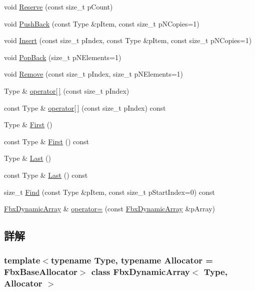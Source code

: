 \begin{DoxyCompactItemize}
void \hyperlink{class_fbx_dynamic_array_a056d5da710401c88f5c92fb5d77c725d}{Reserve} (const size\+\_\+t p\+Count)
\item 
void \hyperlink{class_fbx_dynamic_array_a50d7516815f9a6ad04a26beb66341dd6}{Push\+Back} (const Type \&p\+Item, const size\+\_\+t p\+N\+Copies=1)
\item 
void \hyperlink{class_fbx_dynamic_array_aee7c781eb7382754473b618e766a601f}{Insert} (const size\+\_\+t p\+Index, const Type \&p\+Item, const size\+\_\+t p\+N\+Copies=1)
\item 
void \hyperlink{class_fbx_dynamic_array_a0b59c646b7ffdbffe1af2e3947426f28}{Pop\+Back} (size\+\_\+t p\+N\+Elements=1)
\item 
void \hyperlink{class_fbx_dynamic_array_abee89faf5555c293ff4332763b9234ba}{Remove} (const size\+\_\+t p\+Index, size\+\_\+t p\+N\+Elements=1)
\item 
Type \& \hyperlink{class_fbx_dynamic_array_a94ce9d01d2bd94e209b0b5bb02d8cd49}{operator\mbox{[}$\,$\mbox{]}} (const size\+\_\+t p\+Index)
\item 
const Type \& \hyperlink{class_fbx_dynamic_array_ada7506435417b4811a85f85706e9ecb9}{operator\mbox{[}$\,$\mbox{]}} (const size\+\_\+t p\+Index) const
\item 
Type \& \hyperlink{class_fbx_dynamic_array_a7eb1f73c2cc10719d104e647dfc0bd39}{First} ()
\item 
const Type \& \hyperlink{class_fbx_dynamic_array_ac7cc372d97cb5004e393cbadbd613249}{First} () const
\item 
Type \& \hyperlink{class_fbx_dynamic_array_a7419abc6a62713e4b7edaec879955425}{Last} ()
\item 
const Type \& \hyperlink{class_fbx_dynamic_array_a58a5256671ee30b3afcda3515543271f}{Last} () const
\item 
size\+\_\+t \hyperlink{class_fbx_dynamic_array_a9fc0e6555886f0e38cd7f5027ed2b6a0}{Find} (const Type \&p\+Item, const size\+\_\+t p\+Start\+Index=0) const
\item 
\hyperlink{class_fbx_dynamic_array}{Fbx\+Dynamic\+Array} \& \hyperlink{class_fbx_dynamic_array_a9f14aeb23c8a864e9fdeeef12096a69a}{operator=} (const \hyperlink{class_fbx_dynamic_array}{Fbx\+Dynamic\+Array} \&p\+Array)
\end{DoxyCompactItemize}


\subsection{詳解}
\subsubsection*{template$<$typename Type, typename Allocator = Fbx\+Base\+Allocator$>$\newline
class Fbx\+Dynamic\+Array$<$ Type, Allocator $>$}

